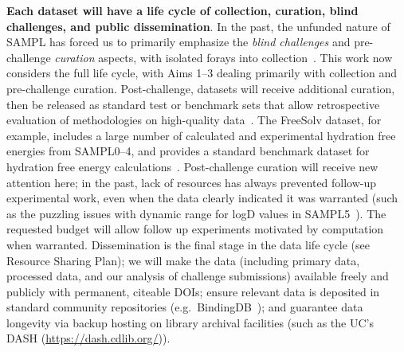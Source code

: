 \documentclass[11pt]{article}
\begin{document}
\textbf{Each dataset will have a life cycle of collection, curation, blind challenges, and public dissemination}.
In the past, the unfunded nature of SAMPL has forced us to primarily emphasize the \emph{blind challenges} and pre-challenge \emph{curation} aspects, with isolated forays into collection~\cite{rustenburg_measuring_2016, Newman:2011:JComputAidedMolDes}. 
This work now considers the full life cycle, with Aims 1--3 dealing primarily with collection and pre-challenge curation.
Post-challenge, 
datasets will receive additional curation, then be released as standard test or benchmark sets that allow retrospective evaluation of methodologies on high-quality data~\cite{mobley_predicting_2016}. 
The FreeSolv dataset, for example, includes a large number of calculated and experimental hydration free energies from SAMPL0--4, and provides a standard benchmark dataset for hydration free energy calculations~\cite{Mobley:2014:JComputAidedMolDes}.
Post-challenge curation will receive new attention here; in the past, lack of resources has always prevented follow-up experimental work, even when the data clearly indicated it was warranted (such as the puzzling issues with dynamic range for logD values in SAMPL5~\cite{rustenburg_measuring_2016, bannan_blind_2016}).
The requested budget will allow follow up experiments motivated by computation when warranted.
Dissemination is the final stage in the data life cycle (see Resource Sharing Plan); we will make the data (including primary data, processed data, and our analysis of challenge submissions) available freely and publicly with permanent, citeable DOIs; ensure relevant data is deposited in standard community repositories (e.g.~BindingDB~\cite{Liu:2007:Nucl.AcidsRes.}); and guarantee data longevity via backup hosting on library archival facilities (such as the UC's DASH (\url{https://dash.cdlib.org/})).

\end{document}
